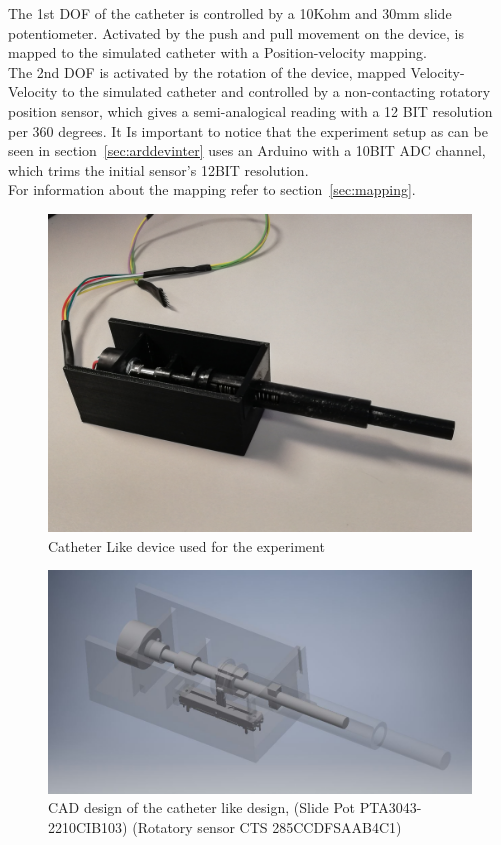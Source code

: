 The 1st DOF of the catheter is controlled by a 10Kohm and 30mm slide potentiometer. Activated by the push and pull movement on the device, is mapped to the simulated catheter with a Position-velocity mapping.\\

The 2nd DOF is activated by the rotation of the device, mapped Velocity-Velocity to the simulated catheter and controlled by a non-contacting rotatory position sensor, which gives a semi-analogical reading with a 12 BIT resolution per 360 degrees. It Is important to notice that the experiment setup as can be seen in section~\ref{sec:arddevinter} uses an Arduino with a 10BIT ADC channel, which trims the initial sensor's 12BIT resolution.\\

For information about the mapping refer to section~\ref{sec:mapping}.\\

\begin{figure}[ht]
   \centering
   \includegraphics[width=0.7\linewidth]{img/catheter.jpg}
   \caption{Catheter Like device used for the experiment}
   \label{img:catheterimg}
\end{figure}

\begin{figure}[ht]
   \centering
   \includegraphics[width=0.7\linewidth]{img/cathetercad.jpg}
   \caption{CAD design of the catheter like design, (Slide Pot PTA3043-2210CIB103) (Rotatory sensor CTS 285CCDFSAAB4C1)}
   \label{img:cathetercad}
\end{figure}

